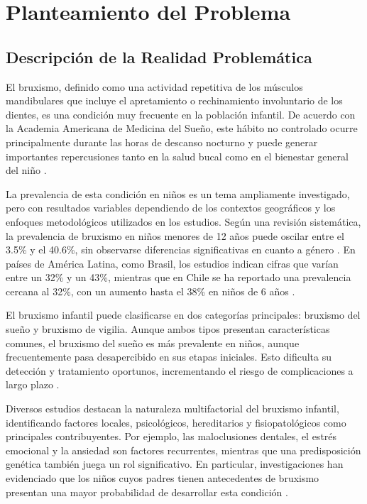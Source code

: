 \chapter{Planteamiento del Problema}
\section{Descripción de la Realidad Problemática}

El bruxismo, definido como una actividad repetitiva de los músculos mandibulares que incluye el apretamiento o rechinamiento involuntario de los dientes, es una condición muy frecuente en la población infantil. De acuerdo con la Academia Americana de Medicina del Sueño, este hábito no controlado ocurre principalmente durante las horas de descanso nocturno y puede generar importantes repercusiones tanto en la salud bucal como en el bienestar general del niño \parencite{AmericanAcademy2014}.

La prevalencia de esta condición en niños es un tema ampliamente investigado, pero con resultados variables dependiendo de los contextos geográficos y los enfoques metodológicos utilizados en los estudios. Según una revisión sistemática, la prevalencia de bruxismo en niños menores de 12 años puede oscilar entre el 3.5\% y el 40.6\%, sin observarse diferencias significativas en cuanto a género \parencite{Manfredini2013}. En países de América Latina, como Brasil, los estudios indican cifras que varían entre un 32\% y un 43\%, mientras que en Chile se ha reportado una prevalencia cercana al 32\%, con un aumento hasta el 38\% en niños de 6 años \parencite{Shinkai1998, Sandoval2016}.

El bruxismo infantil puede clasificarse en dos categorías principales: bruxismo del sueño y bruxismo de vigilia. Aunque ambos tipos presentan características comunes, el bruxismo del sueño es más prevalente en niños, aunque frecuentemente pasa desapercibido en sus etapas iniciales. Esto dificulta su detección y tratamiento oportunos, incrementando el riesgo de complicaciones a largo plazo \parencite{Camoin2017}.

Diversos estudios destacan la naturaleza multifactorial del bruxismo infantil, identificando factores locales, psicológicos, hereditarios y fisiopatológicos como principales contribuyentes. Por ejemplo, las maloclusiones dentales, el estrés emocional y la ansiedad son factores recurrentes, mientras que una predisposición genética también juega un rol significativo. En particular, investigaciones han evidenciado que los niños cuyos padres tienen antecedentes de bruxismo presentan una mayor probabilidad de desarrollar esta condición \parencite{Abe1966, Lobbezoo1997}.

